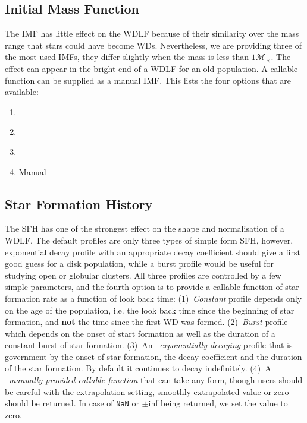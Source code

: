 \documentclass[fleqn,usenatbib]{rasti}
\newcommand{\msun}{\mathcal{M}_{\sun}}
\begin{document}
\subsection{Initial Mass Function}
The IMF has little effect on the WDLF because of their similarity over the mass
range that stars could have become WDs. Nevertheless, we are providing three
of the most used IMFs, they differ slightly when the mass is less than $1\msun$.
The effect can appear in the bright end of a WDLF for an old population. A
callable function can be supplied as a manual IMF. This lists the four options
that are available:

\begin{enumerate}
    \item \citet{2001MNRAS.322..231K}
    \item \citet{2003PASP..115..763C}
    \item \citet[][including binary]{2003PASP..115..763C}
    \item Manual
\end{enumerate}

\subsection{Star Formation History}
The SFH has one of the strongest effect on the shape and normalisation of a
WDLF. The default profiles are only three types of simple form SFH, however,
exponential decay profile with an appropriate decay coefficient should give a
first good guess for a disk population, while a burst profile would be useful
for studying open or globular clusters. All three profiles are controlled by
a few simple parameters, and the fourth option is to provide a callable
function of star formation rate as a function of look back time:
(1)~\textit{Constant} profile depends only on the age of the population,
i.e. the look back time since the beginning of star formation,
and \textbf{not} the time since the first WD was formed. (2)~\textit{Burst}
profile which depends on the onset of start formation as well as the duration
of a constant burst of star formation. (3)~An ~\textit{exponentially decaying}
profile that is government by the onset of star formation, the decay coefficient
and the duration of the star formation. By default it continues to decay
indefinitely. (4)~A ~\textit{manually provided callable function} that can take
any form, though users should be careful with the extrapolation setting,
smoothly extrapolated value or zero should be returned. In case of \verb+NaN+
or $\pm$inf being returned, we set the value to zero.
\end{document}
